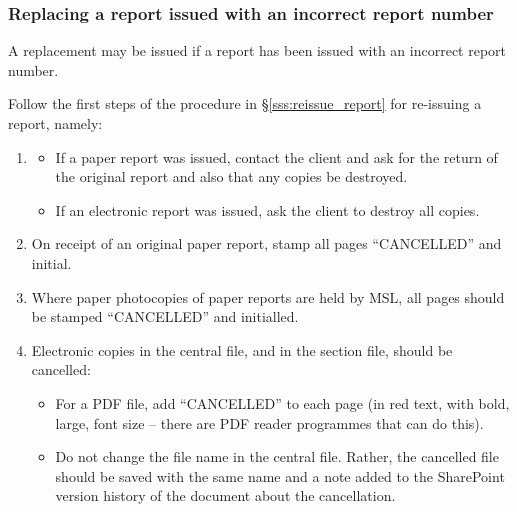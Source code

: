 \subsubsection{Replacing a report issued with an incorrect report number}

A replacement may be issued if a report has been issued with an incorrect report number. 

Follow the first steps of the procedure in \S\ref{sss:reissue_report} for re-issuing a report, namely:

\begin{enumerate}
\item 
\begin{itemize} 
\item If a paper report was issued, contact the client and ask for the return of the original report and also that any copies be destroyed. 

\item If an electronic report was issued, ask the client to destroy all copies.
\end{itemize}

\item On receipt of an original paper report, stamp all pages ``{\color{red}CANCELLED}” and initial.

\item Where paper photocopies of paper reports are held by MSL, all pages should be stamped ``{\color{red}CANCELLED}” and initialled.

\item Electronic copies in the central file, and in the section file, should be cancelled:
\begin{itemize}
\item For a PDF file, add “{\color{red}CANCELLED}” to each page (in red text, with bold, large, font size – there are PDF reader programmes that can do this). 
\item Do not change the file name in the central file. Rather, the cancelled file should be saved with the same name and a note added to the SharePoint version history of the document about the cancellation. 
\end{itemize}
\end{enumerate}

